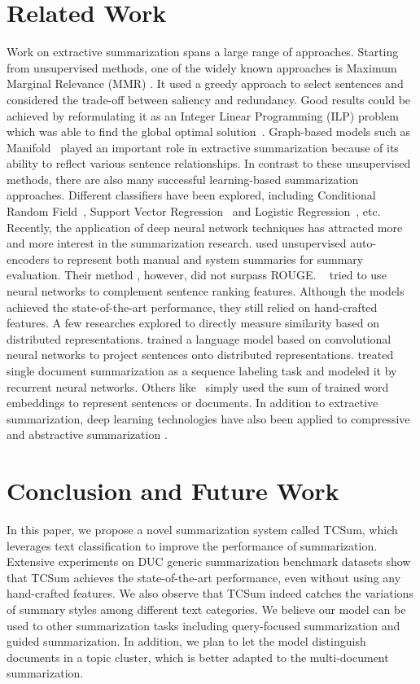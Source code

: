 \documentclass[letterpaper]{article}
\begin{document}
\section{Related Work}
Work on extractive summarization spans a large range of approaches.
Starting from unsupervised methods, one of the widely known approaches is Maximum Marginal Relevance (MMR) \cite{carbonell1998use}. It used a greedy approach to select sentences and considered the trade-off between saliency and redundancy.
Good results could be achieved by reformulating it as an Integer Linear Programming (ILP) problem which was able to find the global optimal solution~\cite{mcdonald2007study,gillick2009scalable}.
Graph-based models such as Manifold~\cite{wan2009graph} played an important role in extractive summarization because of its ability to reflect various sentence relationships.
In contrast to these unsupervised methods, there are also many successful learning-based summarization approaches.
Different classifiers have been explored, including Conditional Random Field~\cite{galley2006skip}, Support Vector Regression~\cite{li2007multi} and Logistic Regression~\cite{li2013using}, etc.  Recently, the application of deep neural network techniques has attracted more and more interest in the summarization research.
\cite{genest2011deep} used unsupervised auto-encoders to represent both manual and system summaries for summary evaluation.
Their method , however, did not surpass ROUGE.
~\cite{cao2015ranking,cao2015learning} tried to use neural networks to complement sentence ranking features.
Although the models achieved the state-of-the-art performance, they still relied on hand-crafted features.
A few researches explored to directly measure similarity based on distributed representations.
\cite{yin2015optimizing} trained a language model based on convolutional neural networks to project sentences onto distributed representations.
\cite{cheng2016neural} treated single document summarization as a sequence labeling task and modeled it by recurrent neural networks.
Others like~\cite{kobayashi-noguchi-yatsuka:2015:EMNLP} simply used the sum of trained word embeddings to represent sentences or documents.
In addition to extractive summarization, deep learning technologies have also been applied to compressive and abstractive summarization \cite{filippova-EtAl:2015:EMNLP,rush-chopra-weston:2015:EMNLP}.

\section{Conclusion and Future Work}
In this paper, we propose a novel summarization system called TCSum, which leverages text classification to improve the performance of summarization.
Extensive experiments on DUC generic summarization benchmark datasets show that TCSum achieves the state-of-the-art performance, even without using any hand-crafted features.
We also observe that TCSum indeed catches the variations of summary styles among different text categories.
We believe our model can be used to other summarization tasks including query-focused summarization and guided summarization.
In addition, we plan to let the model distinguish documents in a topic cluster, which is better adapted to the multi-document summarization.
\end{document}
